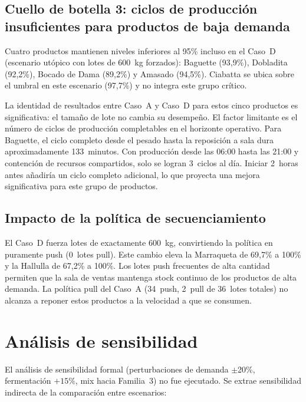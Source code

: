 \documentclass[12pt]{article}
\begin{document}
\subsection{Cuello de botella 3: ciclos de producción insuficientes para productos de baja demanda}

Cuatro productos mantienen niveles inferiores al 95\% incluso en el Caso~D (escenario utópico con lotes de 600~kg forzados): Baguette (93,9\%), Dobladita (92,2\%), Bocado de Dama (89,2\%) y Amasado (94,5\%). Ciabatta se ubica sobre el umbral en este escenario (97,7\%) y no integra este grupo crítico.

La identidad de resultados entre Caso~A y Caso~D para estos cinco productos es significativa: el tamaño de lote no cambia su desempeño. El factor limitante es el número de ciclos de producción completables en el horizonte operativo. Para Baguette, el ciclo completo desde el pesado hasta la reposición a sala dura aproximadamente 133~minutos. Con producción desde las 06:00 hasta las 21:00 y contención de recursos compartidos, solo se logran 3~ciclos al día. Iniciar 2~horas antes añadiría un ciclo completo adicional, lo que proyecta una mejora significativa para este grupo de productos.

\subsection{Impacto de la política de secuenciamiento}

El Caso~D fuerza lotes de exactamente 600~kg, convirtiendo la política en puramente push (0~lotes pull). Este cambio eleva la Marraqueta de 69,7\% a 100\% y la Hallulla de 67,2\% a 100\%. Los lotes push frecuentes de alta cantidad permiten que la sala de ventas mantenga stock continuo de los productos de alta demanda. La política pull del Caso~A (34~push, 2~pull de 36~lotes totales) no alcanza a reponer estos productos a la velocidad a que se consumen.

\newpage
\section{Análisis de sensibilidad}
\label{sec:sensibilidad}

El análisis de sensibilidad formal (perturbaciones de demanda $\pm$20\%, fermentación $+15\%$, mix hacia Familia~3) no fue ejecutado. Se extrae sensibilidad indirecta de la comparación entre escenarios:
\end{document}
